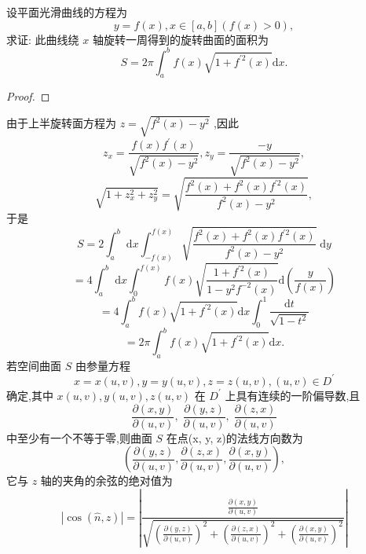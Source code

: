 \begin{example}

\end{example}
设平面光滑曲线的方程为
\[
y = f\left( x\right) ,x \in  \left\lbrack  {a,b}\right\rbrack  \left( {f\left( x\right)  > 0}\right) ,
\]
求证: 此曲线绕 \(x\) 轴旋转一周得到的旋转曲面的面积为
\[
S = {2\pi }{\int }_{a}^{b}f\left( x\right) \sqrt{1 + {f}^{\prime 2}\left( x\right) }\mathrm{d}x.
\]
\begin{proof}

\end{proof}
由于上半旋转面方程为 \(z = \sqrt{{f}^{2}\left( x\right)  - {y}^{2}}\) ,因此
\[
{z}_{x} = \frac{f\left( x\right) {f}^{\prime }\left( x\right) }{\sqrt{{f}^{2}\left( x\right)  - {y}^{2}}},{z}_{y} = \frac{-y}{\sqrt{{f}^{2}\left( x\right)  - {y}^{2}}},
\]
\[
\sqrt{1 + {z}_{x}^{2} + {z}_{y}^{2}} = \sqrt{\frac{{f}^{2}\left( x\right)  + {f}^{2}\left( x\right) {f}^{\prime 2}\left( x\right) }{{f}^{2}\left( x\right)  - {y}^{2}}},
\]
于是
\[
S = 2{\int }_{a}^{b}\mathrm{\;d}x{\int }_{-f\left( x\right) }^{f\left( x\right) }\sqrt{\frac{{f}^{2}\left( x\right)  + {f}^{2}\left( x\right) {f}^{\prime 2}\left( x\right) }{{f}^{2}\left( x\right)  - {y}^{2}}}\mathrm{\;d}y
\]
\[
= 4{\int }_{a}^{b}\mathrm{\;d}x{\int }_{0}^{f\left( x\right) }f\left( x\right) \sqrt{\frac{1 + {f}^{\prime 2}\left( x\right) }{1 - {y}^{2}{f}^{-2}\left( x\right) }}\mathrm{d}\left( \frac{y}{f\left( x\right) }\right)
\]
\[
= 4{\int }_{a}^{b}f\left( x\right) \sqrt{1 + {f}^{\prime 2}\left( x\right) }\mathrm{d}x{\int }_{0}^{1}\frac{\mathrm{d}t}{\sqrt{1 - {t}^{2}}}
\]
\[
= {2\pi }{\int }_{a}^{b}f\left( x\right) \sqrt{1 + {f}^{\prime 2}\left( x\right) }\mathrm{d}x.
\]
若空间曲面 \(S\) 由参量方程
\[
x = x\left( {u,v}\right) ,y = y\left( {u,v}\right) ,z = z\left( {u,v}\right) ,\left( {u,v}\right)  \in  {D}^{\prime } \tag{3}
\]
确定,其中 \(x\left( {u,v}\right) ,y\left( {u,v}\right) ,z\left( {u,v}\right)\) 在 \({D}^{\prime }\) 上具有连续的一阶偏导数,且
\[
\frac{\partial \left( {x,y}\right) }{\partial \left( {u,v}\right) },\;\frac{\partial \left( {y,z}\right) }{\partial \left( {u,v}\right) },\;\frac{\partial \left( {z,x}\right) }{\partial \left( {u,v}\right) }
\]
中至少有一个不等于零,则曲面 \(S\) 在点(x, y, z)的法线方向数为
\[
\left( {\frac{\partial \left( {y,z}\right) }{\partial \left( {u,v}\right) },\frac{\partial \left( {z,x}\right) }{\partial \left( {u,v}\right) },\frac{\partial \left( {x,y}\right) }{\partial \left( {u,v}\right) }}\right) ,
\]
它与 \(z\) 轴的夹角的余弦的绝对值为
\[
\left| {\cos \left( {\widehat{n},z}\right) }\right|  = \left| \frac{\frac{\partial \left( {x,y}\right) }{\partial \left( {u,v}\right) }}{\sqrt{{\left( \frac{\partial \left( {y,z}\right) }{\partial \left( {u,v}\right) }\right) }^{2} + {\left( \frac{\partial \left( {z,x}\right) }{\partial \left( {u,v}\right) }\right) }^{2} + {\left( \frac{\partial \left( {x,y}\right) }{\partial \left( {u,v}\right) }\right) }^{2}}}\right|
\]
